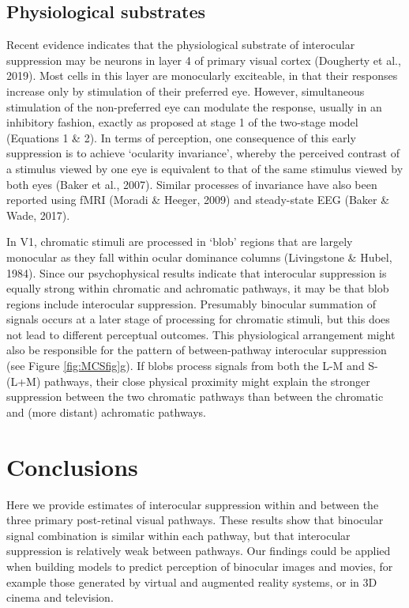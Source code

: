 \documentclass[
]{article}
\begin{document}
\hypertarget{physiological-substrates}{%
\subsection{Physiological substrates}\label{physiological-substrates}}

Recent evidence indicates that the physiological substrate of interocular suppression may be neurons in layer 4 of primary visual cortex (Dougherty et al., 2019). Most cells in this layer are monocularly exciteable, in that their responses increase only by stimulation of their preferred eye. However, simultaneous stimulation of the non-preferred eye can modulate the response, usually in an inhibitory fashion, exactly as proposed at stage 1 of the two-stage model (Equations 1 \& 2). In terms of perception, one consequence of this early suppression is to achieve `ocularity invariance', whereby the perceived contrast of a stimulus viewed by one eye is equivalent to that of the same stimulus viewed by both eyes (Baker et al., 2007). Similar processes of invariance have also been reported using fMRI (Moradi \& Heeger, 2009) and steady-state EEG (Baker \& Wade, 2017).

In V1, chromatic stimuli are processed in `blob' regions that are largely monocular as they fall within ocular dominance columns (Livingstone \& Hubel, 1984). Since our psychophysical results indicate that interocular suppression is equally strong within chromatic and achromatic pathways, it may be that blob regions include interocular suppression. Presumably binocular summation of signals occurs at a later stage of processing for chromatic stimuli, but this does not lead to different perceptual outcomes. This physiological arrangement might also be responsible for the pattern of between-pathway interocular suppression (see Figure \ref{fig:MCSfig}g). If blobs process signals from both the L-M and S-(L+M) pathways, their close physical proximity might explain the stronger suppression between the two chromatic pathways than between the chromatic and (more distant) achromatic pathways.

\hypertarget{conclusions}{%
\section{Conclusions}\label{conclusions}}

Here we provide estimates of interocular suppression within and between the three primary post-retinal visual pathways. These results show that binocular signal combination is similar within each pathway, but that interocular suppression is relatively weak between pathways. Our findings could be applied when building models to predict perception of binocular images and movies, for example those generated by virtual and augmented reality systems, or in 3D cinema and television.
\end{document}
